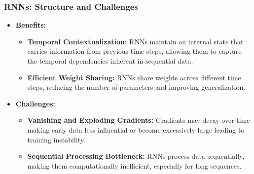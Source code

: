 \documentclass{beamer}
\begin{document}
\begin{frame}
\frametitle{RNNs: Structure and Challenges}
    \begin{itemize}
        \item \textbf{Benefits:}
        \begin{itemize}
            \item \textbf{Temporal Contextualization:} RNNs maintain an internal state that carries information from previous time steps, allowing them to capture the temporal dependencies inherent in sequential data.
            \item \textbf{Efficient Weight Sharing:} RNNs share weights across different time steps, reducing the number of parameters and improving generalization.
        \end{itemize}
        
        \item \textbf{Challenges:}
        \begin{itemize}
            \item \textbf{Vanishing and Exploding Gradients:}
            Gradients may decay over time making early data less influential or
            become excessively large leading to training instability.

           
            \item \textbf{Sequential Processing Bottleneck:}
            RNNs process data sequentially, making them computationally inefficient, especially for long sequences.
           
        \end{itemize}
    \end{itemize}
\end{frame}
\end{document}
